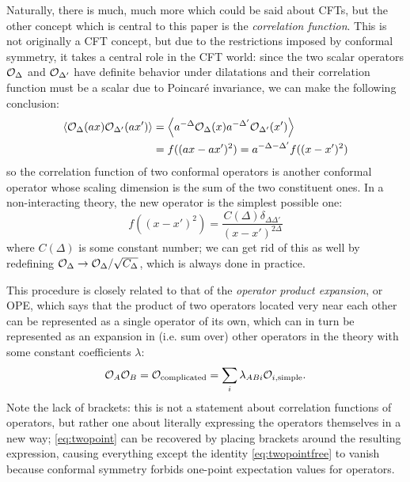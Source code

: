 Naturally, there is much, much more which could be said about CFTs, but the
other concept which is central to this paper is the \emph{correlation function}.
This is not originally a CFT concept, but due to the restrictions imposed by
conformal symmetry, it takes a central role in the CFT world: since the two
scalar operators ${\cal O}_\Delta$ and ${\cal O}_{\Delta'}$ have definite
behavior under dilatations and their correlation function must be a scalar due
to Poincar\'e invariance, we can make the following conclusion:
\begin{align}
    \left \langle {\cal O}_\Delta(ax) {\cal O}_{\Delta'}(ax') \right \rangle
    &= \left \langle a^{-\Delta} {\cal O}_\Delta(x) 
                    a^{-\Delta'} {\cal O}_{\Delta'}(x') \right \rangle \\
    &= f((ax - ax')^2) = a^{-\Delta - \Delta'} f((x - x')^2)
    \label{eq:twopoint}
\end{align}
so the correlation function of two conformal operators is another conformal
operator whose scaling dimension is the sum of the two constituent ones. In a 
non-interacting theory, the new operator is the simplest possible one:
\begin{equation}
    f((x - x')^2) = \frac{C(\Delta) \delta_{\Delta \Delta'}}{(x - x')^{2\Delta}}
    \label{eq:twopointfree}
\end{equation}
where $C(\Delta)$ is some constant number; we can get rid of this as well by 
redefining ${\cal O}_\Delta \to {\cal O}_\Delta / \sqrt{C_{\Delta}}$, which is 
always done in practice.

This procedure is closely related to that of the \emph{operator product
expansion}, or OPE, which says that the product of two operators located very
near each other can be represented as a single operator of its own, which can in
turn be represented as an expansion in (i.e. sum over) other operators in the
theory with some constant coefficients $\lambda$:
\begin{equation}
    {\cal O}_A {\cal O}_B = {\cal O}_\mathrm{complicated} 
    = \sum_i \lambda_{A B i} {\cal O}_{i,\mathrm{simple}}.
\end{equation}
Note the lack of brackets: this is not a statement about correlation functions
of operators, but rather one about literally expressing the operators themselves
in a new way; \eqref{eq:twopoint} can be recovered by placing brackets around
the resulting expression, causing everything except the identity 
\eqref{eq:twopointfree} to vanish because conformal symmetry forbids one-point
expectation values for operators.

